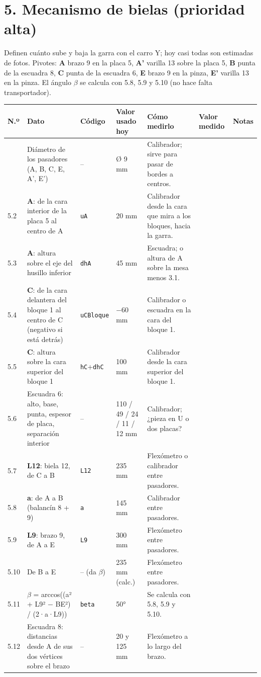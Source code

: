 \documentclass[10pt]{article}
\makeatletter
\newenvironment{medidas}{%
  \small
  \begin{longtable}{@{}L{0.9cm}L{5.0cm}L{2.3cm}L{2.7cm}L{6.4cm}>{\columncolor{fondo}}L{3.1cm}L{2.4cm}@{}}
  \toprule
  \textbf{N.º} & \textbf{Dato} & \textbf{Código} & \textbf{Valor usado hoy} & \textbf{Cómo medirlo} & \textbf{Valor medido} & \textbf{Notas}\\
  \midrule\endhead
  \bottomrule\endfoot}{\end{longtable}}
\newcommand{\cod}[1]{\texttt{\footnotesize #1}}
\makeatother
\begin{document}
\section{5. Mecanismo de bielas (prioridad alta)}
Definen cuánto sube y baja la garra con el carro Y; hoy casi todas son estimadas de fotos. Pivotes: \textbf{A} brazo 9 en la placa 5, \textbf{A'} varilla 13
sobre la placa 5, \textbf{B} punta de la escuadra 8, \textbf{C} punta de la escuadra 6, \textbf{E} brazo 9 en la pinza, \textbf{E'} varilla 13 en la pinza.
El ángulo $\beta$ se calcula con 5.8, 5.9 y 5.10 (no hace falta transportador).
\begin{medidas}
5.1 & Diámetro de los pasadores (A, B, C, E, A', E') & -- & Ø 9 mm & Calibrador; sirve para pasar de bordes a centros. & & \\
5.2 & \textbf{A}: de la cara interior de la placa 5 al centro de A & \cod{uA} & 20 mm & Calibrador desde la cara que mira a los bloques, hacia la garra. & & \\
5.3 & \textbf{A}: altura sobre el eje del husillo inferior & \cod{dhA} & 45 mm & Escuadra; o altura de A sobre la mesa menos 3.1. & & \\
5.4 & \textbf{C}: de la cara delantera del bloque 1 al centro de C (negativo si está detrás) & \cod{uCBloque} & $-$60 mm & Calibrador o escuadra en la cara del bloque 1. & & \\
5.5 & \textbf{C}: altura sobre la cara superior del bloque 1 & \cod{hC}+\cod{dhC} & 100 mm & Calibrador desde la cara superior del bloque 1. & & \\
5.6 & Escuadra 6: alto, base, punta, espesor de placa, separación interior & -- & 110 / 49 / 24 / 11 / 12 mm & Calibrador; ¿pieza en U o dos placas? & & \\
5.7 & \textbf{L12}: biela 12, de C a B & \cod{L12} & 235 mm & Flexómetro o calibrador entre pasadores. & & \\
5.8 & \textbf{a}: de A a B (balancín 8 + 9) & \cod{a} & 145 mm & Calibrador entre pasadores. & & \\
5.9 & \textbf{L9}: brazo 9, de A a E & \cod{L9} & 300 mm & Flexómetro entre pasadores. & & \\
5.10 & De B a E & -- (da $\beta$) & 235 mm (calc.) & Flexómetro entre pasadores. & & \\
5.11 & $\beta$ = arccos((a² + L9² $-$ BE²) / (2·a·L9)) & \cod{beta} & 50° & Se calcula con 5.8, 5.9 y 5.10. & & \\
5.12 & Escuadra 8: distancias desde A de sus dos vértices sobre el brazo & -- & 20 y 125 mm & Flexómetro a lo largo del brazo. & & \\

\end{medidas}
\end{document}
